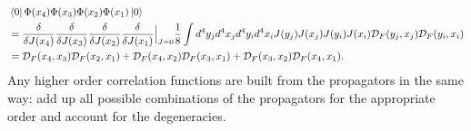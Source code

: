 \documentclass[12pt]{article}
\begin{document}
\begin{equation}
\begin{split}
&\bra{0}\Phi(x_4)\Phi(x_3)\Phi(x_2)\Phi(x_1)\ket{0} \\
&= \frac{\delta}{\delta J(x_4)}\frac{\delta}{\delta J(x_3)}\frac{\delta}{\delta J(x_2)}\frac{\delta}{\delta J(x_1)}\Big|_{J=0} 
\frac{1}{8}\int d^4y_j d^4x_j d^4y_i d^4x_i J(y_j) J(x_j) J(y_i) J(x_i) \mathcal{D}_F(y_j,x_j) \mathcal{D}_F(y_i,x_i) \\ 
&= \mathcal{D}_F(x_4, x_3) \mathcal{D}_F(x_2, x_1) + \mathcal{D}_F(x_4, x_2) \mathcal{D}_F(x_3, x_1) + \mathcal{D}_F(x_3, x_2) \mathcal{D}_F(x_4, x_1).
\end{split}
\end{equation}
Any higher order correlation functions are built from the propagators in the same way: add up all possible combinations of the propagators for the appropriate order and account for the degeneracies. 
\end{document}
